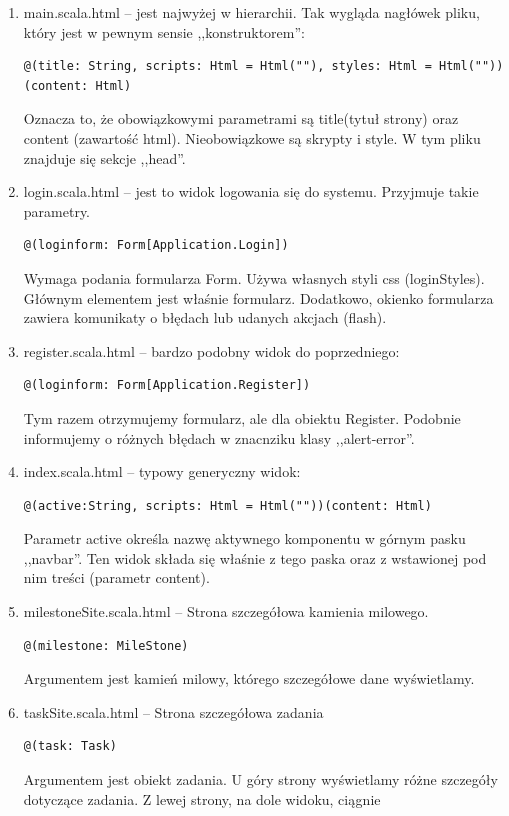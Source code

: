 \documentclass[a4paper,12pt,notitlepage]{mwrep}
\begin{document}
\begin{enumerate}
	\item main.scala.html -- jest najwyżej w hierarchii. Tak wygląda nagłówek pliku, który jest w pewnym sensie ,,konstruktorem'':
		\begin{verbatim}@(title: String, scripts: Html = Html(""), styles: Html = Html(""))(content: Html)\end{verbatim}
		Oznacza to, że obowiązkowymi parametrami są title(tytuł strony) oraz content (zawartość html). Nieobowiązkowe są skrypty i style. 
		W tym pliku znajduje się sekcje ,,head''.
	\item  	login.scala.html -- jest to widok logowania się do systemu. Przyjmuje takie parametry.
		\begin{verbatim}@(loginform: Form[Application.Login])\end{verbatim} 
		Wymaga podania formularza Form. Używa własnych styli css (loginStyles). Głównym elementem jest właśnie formularz. Dodatkowo, okienko 
		formularza zawiera komunikaty o błędach lub udanych akcjach (flash).
	\item	register.scala.html -- bardzo podobny widok do poprzedniego:
		\begin{verbatim}@(loginform: Form[Application.Register])\end{verbatim} 
		Tym razem otrzymujemy formularz, ale dla obiektu Register. Podobnie informujemy o różnych błędach w znacnziku klasy ,,alert-error''. 
	\item	index.scala.html -- typowy generyczny widok:
		\begin{verbatim}@(active:String, scripts: Html = Html(""))(content: Html)\end{verbatim}
		Parametr active określa nazwę aktywnego komponentu w górnym pasku ,,navbar''. Ten widok składa się właśnie z tego paska oraz z 
		wstawionej pod nim treści (parametr content).
	\item	milestoneSite.scala.html -- Strona szczegółowa kamienia milowego.
		\begin{verbatim}@(milestone: MileStone)\end{verbatim}
		Argumentem jest kamień milowy, którego szczegółowe dane wyświetlamy.
	\item	taskSite.scala.html -- Strona szczegółowa zadania
		\begin{verbatim}@(task: Task)\end{verbatim}
		Argumentem jest obiekt zadania. U góry strony wyświetlamy różne szczegóły dotyczące zadania. Z lewej strony, na dole widoku, ciągnie 

\end{enumerate}
\end{document}
